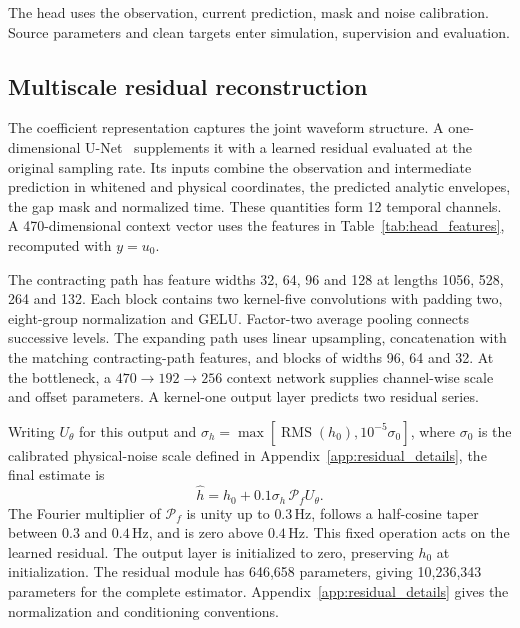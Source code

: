 \documentclass[10pt,prd,aps,a4paper,twocolumn,superscriptaddress,nofootinbib,floatfix]{revtex4-2}
\begin{document}
The head uses the observation, current prediction, mask and noise calibration. Source parameters and clean targets enter simulation, supervision and evaluation.

\subsection{Multiscale residual reconstruction}\label{sec:multiscale}
The coefficient representation captures the joint waveform structure. A one-dimensional U-Net~\cite{Ronneberger2015UNet} supplements it with a learned residual evaluated at the original sampling rate. Its inputs combine the observation and intermediate prediction in whitened and physical coordinates, the predicted analytic envelopes, the gap mask and normalized time. These quantities form 12 temporal channels. A 470-dimensional context vector uses the features in Table~\ref{tab:head_features}, recomputed with $y=u_0$.

The contracting path has feature widths 32, 64, 96 and 128 at lengths 1056, 528, 264 and 132. Each block contains two kernel-five convolutions with padding two, eight-group normalization and GELU. Factor-two average pooling connects successive levels. The expanding path uses linear upsampling, concatenation with the matching contracting-path features, and blocks of widths 96, 64 and 32. At the bottleneck, a $470\to192\to256$ context network supplies channel-wise scale and offset parameters. A kernel-one output layer predicts two residual series.

Writing $U_\theta$ for this output and $\sigma_h=\max[\operatorname{RMS}(h_0),10^{-5}\sigma_0]$, where $\sigma_0$ is the calibrated physical-noise scale defined in Appendix~\ref{app:residual_details}, the final estimate is
\begin{equation}
\widehat h=h_0+0.1\sigma_h\,\mathcal P_f U_\theta.\label{eq:multiscale_output}
\end{equation}
The Fourier multiplier of $\mathcal P_f$ is unity up to $0.3\,\mathrm{Hz}$, follows a half-cosine taper between $0.3$ and $0.4\,\mathrm{Hz}$, and is zero above $0.4\,\mathrm{Hz}$. This fixed operation acts on the learned residual. The output layer is initialized to zero, preserving $h_0$ at initialization. The residual module has 646,658 parameters, giving 10,236,343 parameters for the complete estimator. Appendix~\ref{app:residual_details} gives the normalization and conditioning conventions.
\end{document}
